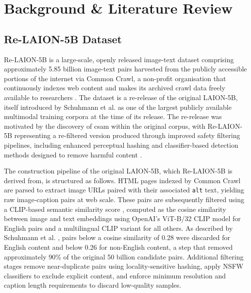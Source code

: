 \graphicspath{{content/chapters/2_background/figures/}}

\chapter{Background \& Literature Review}%
\label{chp:background&lit}




\section{Re-LAION-5B Dataset}
Re-LAION-5B is a large-scale, openly released image-text dataset comprising approximately 5.85 billion image-text pairs harvested from the publicly accessible portions of the internet via Common Crawl, a non-profit organisation that continuously indexes web content and makes its archived crawl data freely available to researchers \cite{Schuhmann_2022_Laion5b, CommonCrawl_2007_CommonCrawl}. The dataset is a re-release of the original LAION-5B, itself introduced by Schuhmann et al. \cite{Schuhmann_2022_Laion5b} as one of the largest publicly available multimodal training corpora at the time of its release. The re-release was motivated by the discovery of \acrshort{csam} within the original corpus, with Re-LAION-5B representing a re-filtered version produced through improved safety filtering pipelines, including enhanced perceptual hashing and classifier-based detection methods designed to remove harmful content \cite{Laion_2024_Relaion5B}.

The construction pipeline of the original LAION-5B, which Re-LAION-5B is derived from, is structured as follows. HTML pages indexed by Common Crawl are parsed to extract image URLs paired with their associated \texttt{alt} text, yielding raw image-caption pairs at web scale. These pairs are subsequently filtered using a CLIP-based semantic similarity score \cite{Radford_2021_CLIP}, computed as the cosine similarity between image and text embeddings using OpenAI's ViT-B/32 CLIP model for English pairs and a multilingual CLIP variant for all others. As described by Schuhmann et al. \cite{Schuhmann_2022_Laion5b}, pairs below a cosine similarity of 0.28 were discarded for English content and below 0.26 for non-English content, a step that removed approximately 90\% of the original 50 billion candidate pairs. Additional filtering stages remove near-duplicate pairs using locality-sensitive hashing, apply NSFW classifiers to exclude explicit content, and enforce minimum resolution and caption length requirements to discard low-quality samples.

